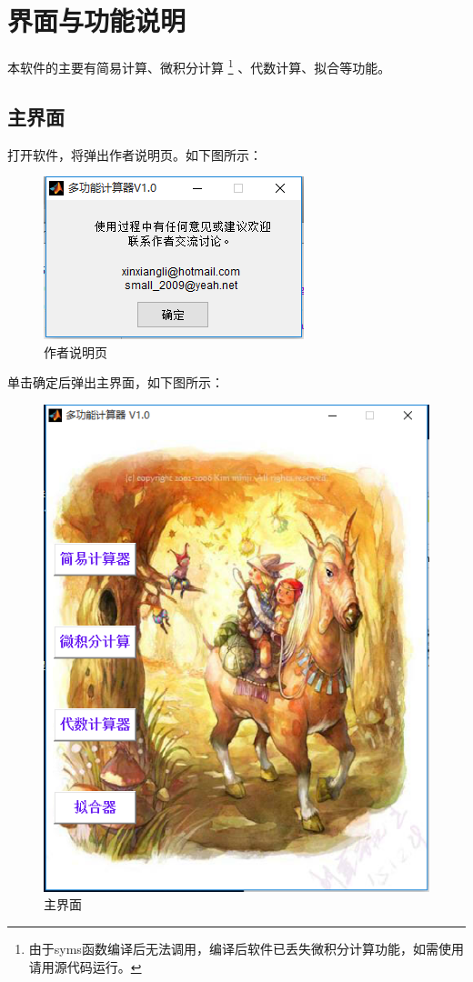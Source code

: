 \documentclass[UTF8]{ctexart}
\begin{document}
\section{界面与功能说明}
本软件的主要有简易计算、微积分计算
\footnote{由于syms函数编译后无法调用，编译后软件已丢失微积分计算功能，如需使用请用源代码运行。}
、代数计算、拟合等功能。

\subsection{主界面}
打开软件，将弹出作者说明页。如下图所示：

\bigskip

\begin{figure}[H]
\centering
\includegraphics[scale=0.7]{image/pic01.png}
\caption{作者说明页}
\label{fig:pic01}
\end{figure}

\clearpage
单击确定后弹出主界面，如下图所示：

\bigskip

\begin{figure}[H]
\centering
\includegraphics[scale=0.6]{image/pic02.png}
\caption{主界面}
\label{fig:pic02}
\end{figure}
\end{document}
